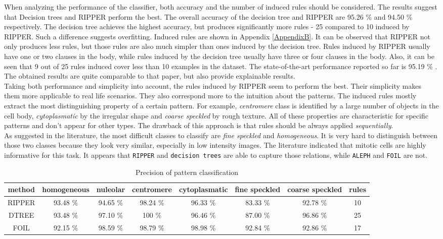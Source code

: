 When analyzing the performance of the classifier, both accuracy and the number of induced rules should be considered. The results suggest that Decision trees and RIPPER perform the best. The overall accuracy of the decision tree and RIPPER are 95.26 \% and 94.50 \% respectively. The decision tree achieves the highest accuracy, but produces significantly  more rules - 25 compared to 10 induced by RIPPER. Such a difference suggests  overfitting. Induced rules are shown in Appendix \ref{AppendixB}. It can be observed that RIPPER not only produces less rules, but those rules are also much simpler than ones induced by the decision tree. Rules induced by RIPPER usually have one or two clauses in the body, while rules induced by the decision tree usually have three or four clauses in the body. Also, it can be seen that 9 out of 25 rules induced cover less than 10 examples in the dataset. The state-of-the-art performance reported so far is 95.19 \% \cite{Wiliem}. The obtained results are quite comparable to that paper, but also provide explainable results.\\

Taking both performance and simplicity into account, the rules induced by RIPPER seem to perform the best. Their simplicity makes them more applicable to real life scenarios. They also correspond more to the intuition about the patterns. The induced rules mostly extract the most distinguishing property of a certain pattern. For example, \textit{centromere} class is identified by a large number of objects in the cell body, \textit{cytoplasmatic} by the irregular shape and \textit{coarse speckled} by rough texture. All of these properties are characteristic for specific patterns and don't appear for other types. The drawback of this approach is that rules should be always applied \textit{sequentially}. \\

As suggested in the literature, the most difficult classes to classify are \textit{fine speckled} and \textit{homogeneous}. It is very hard to distinguish between those two classes because they look very similar, especially in low intensity images. The literature indicated that mitotic cells are highly informative for this task. It appears that  \texttt{RIPPER} and \texttt{decision trees} are able to capture those relations, while \texttt{ALEPH} and \texttt{FOIL} are not.

\begin{table}
	\caption{Precision of pattern classification}
	\label{tab:Precision}
	\tiny
	\centering
	\begin{tabular}{|c|c|c|c|c|c|c|c|}
		\textbf{method} & homogeneous & nuleolar & centromere & cytoplasmatic & fine speckled & coarse speckled & rules \\
		\hline
		\hline
		RIPPER & 93.48 \% & 94.65 \% & 98.24 \% & 96.33 \% & 83.33 \% & 92.78 \% & 10 \\
		\hline	
		DTREE & 93.48 \% & 97.10 \% & 100 \% & 96.46 \% & 87.00 \% & 96.86 \% & 25 \\	
		\hline
		FOIL & 92.15 \% & 98.59 \% & 98.79 \% & 98.98 \% & 92.84 \% & 92.86 \% & 17 \\ 
	\end{tabular}
\end{table}

